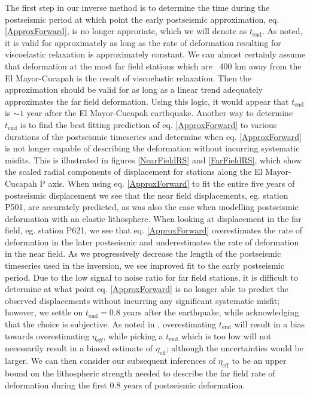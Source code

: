 \documentclass[12pt]{article}
\begin{document}
The first step in our inverse method is to determine the time during the postseismic period at which point the early postseismic approximation, eq. \ref{ApproxForward}, is no longer approriate, which we will denote as $t_{\mathrm{end}}$.  As noted, it is valid for approximately as long as the rate of deformation resulting for viscoelastic relaxation is approximately constant. We can almost certainly assume that deformation at the most far field stations which are ~400 km away from the El Mayor-Cucapah is the result of viscoelastic relaxation. Then the approximation should be valid for as long as a linear trend adequately approximates the far field deformation. Using this logic, it would appear that $t_{\mathrm{end}}$ is $\sim1$ year after the El Mayor-Cucapah earthquake.  Another way to determine $t_{\mathrm{end}}$ is to find the best fitting prediction of eq. \ref{ApproxForward} to various durations of the postseismic timeseries and determine when eq. \ref{ApproxForward} is not longer capable of describing the deformation without incurring systematic misfits.  This is illustrated in figures \ref{NearFieldRS} and \ref{FarFieldRS}, which show the scaled radial components of displacement for stations along the El Mayor-Cucapah P axis.  When using eq. \ref{ApproxForward} to fit the entire five years of postseismic displacement we see that the near field displacements, eg. station P501, are accurately predicted, as was also the case when modelling postseismic deformation with an elastic lithosphere.  When looking at displacement in the far field, eg. station P621, we see that eq. \ref{ApproxForward} overestimates the rate of deformation in the later postseismic and underestimates the rate of deformation in the near field.  As we progressively decrease the length of the postseismic timeseries used in the inversion, we see improved fit to the early postseismic period. Due to the low signal to noise ratio for far field stations, it is difficult to determine at what point eq. \ref{ApproxForward} is no longer able to predict the observed displacements without incurring any significant systematic misfit; however, we settle on $t_{\mathrm{end}}=0.8$ years after the earthquake, while acknowledging that the choice is subjective. As noted in \cite{Hines2015}, overestimating $t_{\mathrm{end}}$ will result in a bias towards overestimating $\eta_{\mathrm{eff}}$, while picking a $t_\mathrm{end}$ which is too low will not necessarily result in a biased estimate of $\eta_\mathrm{eff}$; although the uncertainties would be larger. We can then consider our subsequent inferences of $\eta_{\mathrm{eff}}$ to be an upper bound on the lithospheric strength needed to describe the far field rate of deformation during the first 0.8 years of postseismic deformation. 
\end{document}
